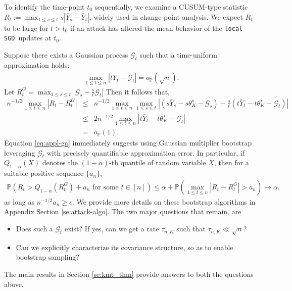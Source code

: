 \documentclass[a4paper,11pt]{article}
\numberwithin{equation}{section}
\theoremstyle{plain}
\theoremstyle{remark}
\newcommand{\DFL}{\texttt{local SGD}}
\newcommand{\minparam}{\theta^\star_K}
\newcommand{\IP}{\mathbb{P}}
\begin{document}
 To identify the time-point $t_0$ sequentially, we examine a CUSUM-type statistic $R_{t}:=\max_{1\leq s \leq t}s|\bar{Y}_s -\bar{Y}_t|$, widely used in change-point analysis. We expect $R_{t}$ to be large for $t > t_0$ if an attack has altered the mean behavior of the \DFL\ updates at $t_0$.

Suppose there exists a Gaussian process $\mathcal{G}_t$ such that a time-uniform approximation holds:  
\begin{align} \label{eq:ga-want}
    \max_{1\leq t \leq n} |t \bar{Y}_t - \mathcal{G}_t|= o_{\IP}(\sqrt{n}).
\end{align}
Let $R_t^G = \max_{1\leq s \leq t} |\mathcal{G}_s - \frac{s}{t}\mathcal{G}_t|$ Then it follows that,
\begin{eqnarray}
    n^{-1/2}\max_{1\leq t \leq n}|R_t - R_t^G| &\leq& n^{-1/2}\max_{1\leq t \leq n}\max_{1\leq s \leq t}|(s\bar{Y}_s - s \minparam - \mathcal{G}_s)- \frac{s}{t}(t\bar{Y}_t - t\minparam- \mathcal{G}_t)| \nonumber \\ &\leq&  2 n^{-1/2}\max_{1 \leq t \leq n}|t\bar{Y}_t - t\minparam- \mathcal{G}_t| \nonumber \\ &=& o_{\IP}(1). \label{eq:appl-ga}
\end{eqnarray}
Equation \eqref{eq:appl-ga} immediately suggests using Gaussian multiplier bootstrap leveraging $\mathcal{G}_t$ with precisely quantifiable approximation error. In particular, if $Q_{1-\alpha}(X)$ denotes the $(1-\alpha)$-th quantile of random variable $X$, then for a suitable positive sequence $\{a_n\}$,
\begin{align}\label{eq:algo}
\mathbb{P}(R_t > Q_{1-\alpha}(R_t^G) + a_n \text{ for some $t\in[n]$}) \leq \alpha + \mathbb{P}(\max_{1\leq t \leq n}|R_t - R_t^G| > a_n)    \to \alpha,
\end{align}
as long as $n^{-1/2}a_n \geq c$. 
We provide more details on these bootstrap algorithms in Appendix Section \ref{se:attack-algo}. The two major questions that remain, are
\begin{itemize}[noitemsep,topsep=0pt,parsep=0pt,partopsep=0pt]
    \item Does such a $\mathcal{G}_t$ exist? If yes, can we get a rate $\tau_{n,K}$ such that $\tau_{n,K} \ll \sqrt{n}$?
    \item Can we explicitly characterize its covariance structure, so as to enable bootstrap sampling?
\end{itemize}
The main results in Section \ref{se:kmt_thm} provide answers to both the questions above. 
\end{document}
